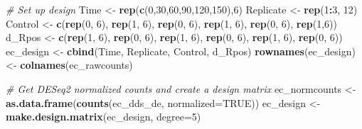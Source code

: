 \documentclass[]{article}
\newenvironment{Shaded}{\begin{snugshade}}{\end{snugshade}}
\newcommand{\KeywordTok}[1]{\textcolor[rgb]{0.13,0.29,0.53}{\textbf{#1}}}
\newcommand{\DataTypeTok}[1]{\textcolor[rgb]{0.13,0.29,0.53}{#1}}
\newcommand{\DecValTok}[1]{\textcolor[rgb]{0.00,0.00,0.81}{#1}}
\newcommand{\StringTok}[1]{\textcolor[rgb]{0.31,0.60,0.02}{#1}}
\newcommand{\CommentTok}[1]{\textcolor[rgb]{0.56,0.35,0.01}{\textit{#1}}}
\newcommand{\OtherTok}[1]{\textcolor[rgb]{0.56,0.35,0.01}{#1}}
\newcommand{\OperatorTok}[1]{\textcolor[rgb]{0.81,0.36,0.00}{\textbf{#1}}}
\newcommand{\NormalTok}[1]{#1}
\begin{document}
\begin{Shaded}
\begin{Highlighting}[]
\CommentTok{# Set up design}
\NormalTok{Time <-}\StringTok{ }\KeywordTok{rep}\NormalTok{(}\KeywordTok{c}\NormalTok{(}\DecValTok{0}\NormalTok{,}\DecValTok{30}\NormalTok{,}\DecValTok{60}\NormalTok{,}\DecValTok{90}\NormalTok{,}\DecValTok{120}\NormalTok{,}\DecValTok{150}\NormalTok{),}\DecValTok{6}\NormalTok{)}
\NormalTok{Replicate <-}\StringTok{ }\KeywordTok{rep}\NormalTok{(}\DecValTok{1}\OperatorTok{:}\DecValTok{3}\NormalTok{, }\DecValTok{12}\NormalTok{)}
\NormalTok{Control <-}\StringTok{ }\KeywordTok{c}\NormalTok{(}\KeywordTok{rep}\NormalTok{(}\DecValTok{0}\NormalTok{, }\DecValTok{6}\NormalTok{), }\KeywordTok{rep}\NormalTok{(}\DecValTok{1}\NormalTok{, }\DecValTok{6}\NormalTok{), }\KeywordTok{rep}\NormalTok{(}\DecValTok{0}\NormalTok{, }\DecValTok{6}\NormalTok{), }\KeywordTok{rep}\NormalTok{(}\DecValTok{1}\NormalTok{, }\DecValTok{6}\NormalTok{), }\KeywordTok{rep}\NormalTok{(}\DecValTok{0}\NormalTok{, }\DecValTok{6}\NormalTok{), }\KeywordTok{rep}\NormalTok{(}\DecValTok{1}\NormalTok{,}\DecValTok{6}\NormalTok{))}
\NormalTok{d_Rpos <-}\StringTok{ }\KeywordTok{c}\NormalTok{(}\KeywordTok{rep}\NormalTok{(}\DecValTok{1}\NormalTok{, }\DecValTok{6}\NormalTok{), }\KeywordTok{rep}\NormalTok{(}\DecValTok{0}\NormalTok{, }\DecValTok{6}\NormalTok{), }\KeywordTok{rep}\NormalTok{(}\DecValTok{1}\NormalTok{, }\DecValTok{6}\NormalTok{), }\KeywordTok{rep}\NormalTok{(}\DecValTok{0}\NormalTok{, }\DecValTok{6}\NormalTok{), }\KeywordTok{rep}\NormalTok{(}\DecValTok{1}\NormalTok{, }\DecValTok{6}\NormalTok{), }\KeywordTok{rep}\NormalTok{(}\DecValTok{0}\NormalTok{, }\DecValTok{6}\NormalTok{))}
\NormalTok{ec_design <-}\StringTok{ }\KeywordTok{cbind}\NormalTok{(Time, Replicate, Control, d_Rpos)}
\KeywordTok{rownames}\NormalTok{(ec_design) <-}\StringTok{ }\KeywordTok{colnames}\NormalTok{(ec_rawcounts)}

\CommentTok{# Get DESeq2 normalized counts and create a design matrix}
\NormalTok{ec_normcounts <-}\StringTok{ }\KeywordTok{as.data.frame}\NormalTok{(}\KeywordTok{counts}\NormalTok{(ec_dds_de, }\DataTypeTok{normalized=}\OtherTok{TRUE}\NormalTok{))}
\NormalTok{ec_design <-}\StringTok{ }\KeywordTok{make.design.matrix}\NormalTok{(ec_design, }\DataTypeTok{degree=}\DecValTok{5}\NormalTok{)}
\end{Highlighting}
\end{Shaded}
\end{document}
